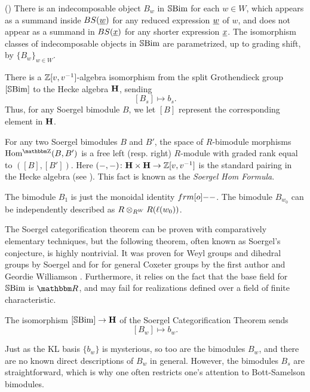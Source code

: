 \begin{thm} \label{thm:SCT} (\cite[Lemma 6.13 and Satz 6.14]{Soer07}) There is an indecomposable object $B_w$ in ${\mathbb{S}}{\rm Bim }$ for each $w \in W$, which
appears as a summand inside $BS(\underline{w})$ for any reduced expression $\underline{w}$ of $w$, and does not appear as a summand in $BS(\underline{x})$ for any shorter expression $\underline{x}$. The
isomorphism classes of indecomposable objects in ${\mathbb{S}}{\rm Bim }$ are parametrized, up to grading shift, by $\{B_w\}_{w \in W}$.

There is a ${\mathbb{Z}}[v,v^{-1}]$-algebra isomorphism from the split Grothendieck group $[{\mathbb{S}}{\rm Bim }]$ to the Hecke algebra ${\mathbf H}$, sending \[ [B_s] \mapsto b_s. \] Thus, for any Soergel bimodule
$B$, we let $[B]$ represent the corresponding element in ${\mathbf H}$.

For any two Soergel bimodules $B$ and $B'$, the space of $R$-bimodule morphisms $\Homg(B,B')$ is a free left (resp. right) $R$-module with graded rank equal to $([B], [B'])$. Here
$(-, -) \colon {\mathbf H} \times {\mathbf H} \rightarrow {\mathbb{Z}}[v,v^{-1}]$ is the standard pairing in the Hecke algebra (see \cite[\S 2.4]{EWsoergelCalc}). This fact is known as the \emph{Soergel Hom Formula}. \end{thm}

\begin{ex} The bimodule $B_1$ is just the monoidal identity $\one$. The bimodule $B_{w_0}$ can be independently described as $R \otimes_{R^{W}} R (\ell(w_0))$. \end{ex}

The Soergel categorification theorem can be proven with comparatively elementary techniques, but the following theorem, often known as Soergel's conjecture, is highly nontrivial.  It was proven for Weyl groups and dihedral groups by Soergel \cite{Soer90, Soer07} and for for general Coxeter groups by the first author and Geordie Williamson \cite{EWHodge}.  Furthermore, it relies on the fact that the base field for ${\mathbb{S}}{\rm Bim }$ is $\R$, and may fail for realizations defined over a field of finite characteristic.

\begin{thm} \label{thm:SC} The isomorphism $[{\mathbb{S}}{\rm Bim }] \rightarrow {\mathbf H}$ of the Soergel Categorification Theorem sends \[ [B_w] \mapsto b_w. \] \end{thm}


Just as the KL basis $\{b_w\}$ is mysterious, so too are the bimodules $B_w$, and there are no known direct descriptions of $B_w$ in general. However, the bimodules $B_s$ are
straightforward, which is why one often restricts one's attention to Bott-Samelson bimodules.

